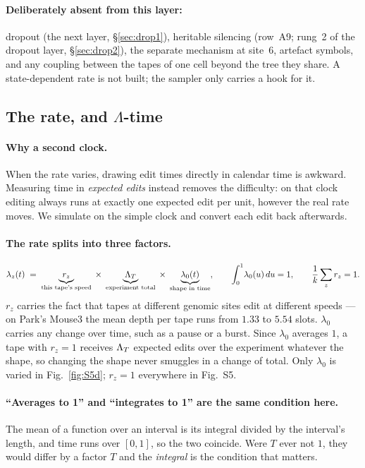 \paragraph{Deliberately absent from this layer:} dropout (the next layer, \S\ref{sec:drop1}), heritable
silencing (row~A9; rung~2 of the dropout layer, \S\ref{sec:drop2}), the separate mechanism at site~6, artefact symbols, and any coupling between the tapes of
one cell beyond the tree they share. A state-dependent rate is not built; the sampler only carries a
hook for it.

\subsection{The rate, and \texorpdfstring{$\Lambda$}{Lambda}-time}\label{sec:lambdatime}

\paragraph{Why a second clock.} When the rate varies, drawing edit times directly in calendar time is
awkward. Measuring time in \emph{expected edits} instead removes the difficulty: on that clock
editing always runs at exactly one expected edit per unit, however the real rate moves. We simulate
on the simple clock and convert each edit back afterwards.

\paragraph{The rate splits into three factors.}
\begin{equation}
  \lambda_z(t) \;=\; \underbrace{r_z}_{\text{this tape's speed}}\;\times\;
                 \underbrace{\Lambda_T}_{\text{experiment total}}\;\times\;
                 \underbrace{\lambda_0(t)}_{\text{shape in time}},
  \qquad \int_0^1\!\lambda_0(u)\,du=1,\qquad \frac1k\sum_z r_z=1 .
  \label{eq:rate}
\end{equation}
$r_z$ carries the fact that tapes at different genomic sites edit at different speeds --- on Park's
Mouse3 the mean depth per tape runs from $1.33$ to $5.54$ slots. $\lambda_0$ carries any change over
time, such as a pause or a burst. Since $\lambda_0$ averages $1$, a tape with $r_z=1$ receives $\Lambda_T$
expected edits over the experiment whatever the shape, so changing the shape never smuggles in a
change of total. Only $\lambda_0$ is varied in Fig.~\ref{fig:S5d}; $r_z=1$ everywhere in Fig.~S5.

\paragraph{``Averages to 1'' and ``integrates to 1'' are the same condition here.} The mean of a
function over an interval is its integral divided by the interval's length, and time runs over
$[0,1]$, so the two coincide. Were $T$ ever not $1$, they would differ by a factor $T$ and the
\emph{integral} is the condition that matters.

